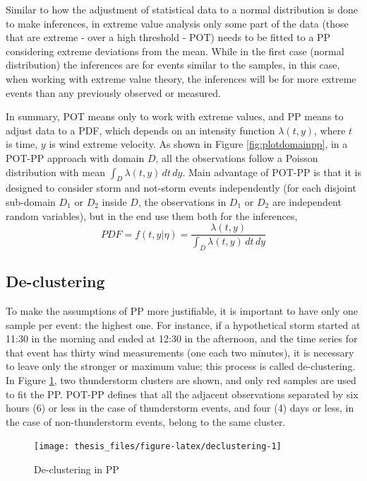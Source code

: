 \documentclass[12pt,oneside]{reedthesis}
\begin{document}
Similar to how the adjustment of statistical data to a normal distribution is done to make inferences, in extreme value analysis only some part of the data (those that are extreme - over a high threshold - POT) needs to be fitted to a PP considering extreme deviations from the mean. While in the first case (normal distribution) the inferences are for events similar to the samples, in this case, when working with extreme value theory, the inferences will be for more extreme events than any previously observed or measured.

In summary, POT means only to work with extreme values, and PP means to adjust data to a PDF, which depends on an intensity function \(\lambda(t,y)\), where \(t\) is time, \(y\) is wind extreme velocity. As shown in Figure \ref{fig:plotdomainpp}, in a POT-PP approach with domain \(D\), all the observations follow a Poisson distribution with mean \(\int_D\lambda(t,y)\,dt\,dy\). Main advantage of POT-PP is that it is designed to consider storm and not-storm events independently (for each disjoint sub-domain \(D_1\) or \(D_2\) inside \(D\), the observations in \(D_1\) or \(D_2\) are independent random variables), but in the end use them both for the inferences,
\begin{equation}
          PDF = f(t,y|\eta) = \frac{\lambda(t,y)}{\int_D\lambda(t,y)\,dt\,dy}
  \label{eq:pppdf}
\end{equation}
\hypertarget{decluster}{%
\subsection{De-clustering}\label{decluster}}

To make the assumptions of PP more justifiable, it is important to have only one sample per event: the highest one. For instance, if a hypothetical storm started at 11:30 in the morning and ended at 12:30 in the afternoon, and the time series for that event has thirty wind measurements (one each two minutes), it is necessary to leave only the stronger or maximum value; this process is called de-clustering. In Figure \ref{fig:declustering}, two thunderstorm clusters are shown, and only red samples are used to fit the PP. POT-PP defines that all the adjacent observations separated by six hours (6) or less in the case of thunderstorm events, and four (4) days or less, in the case of non-thunderstorm events, belong to the same cluster.

\footnotesize
\begin{figure}

{\centering \texttt{[image: thesis\_files/figure-latex/declustering-1]} 

}

\caption{De-clustering in PP}\label{fig:declustering}
\end{figure}
\normalsize
\end{document}
